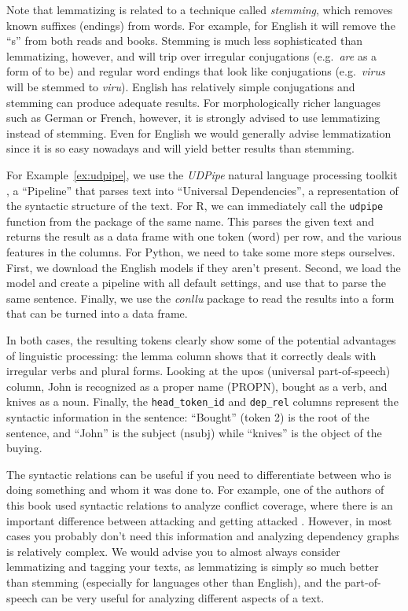 Note that lemmatizing is related to a technique called \emph{stemming}, which removes known suffixes (endings) from words.
For example, for English it will remove the ``s'' from both reads and books.
Stemming is much less sophisticated than lemmatizing, however, and will trip over irregular conjugations
(e.g.\ \emph{are} as a form of to be) and regular word endings that look like conjugations (e.g.\ \emph{virus} will be stemmed to \emph{viru}).
English has relatively simple conjugations and stemming can produce adequate results.
For morphologically richer languages such as German or French, however, it is strongly advised to use lemmatizing instead of stemming.
Even for English we would generally advise lemmatization since it is so easy nowadays and will yield better results than stemming.

For Example~\ref{ex:udpipe}, we use the \emph{UDPipe} natural language processing toolkit \citep{udpipe},
a ``Pipeline'' that parses text into ``Universal Dependencies'', a representation of the syntactic structure of the text.
For R, we can immediately call the \texttt{udpipe} function from the package of the same name.
This parses the given text and returns the result as a data frame with one token (word) per row,
and the various features in the columns.
For Python, we need to take some more steps ourselves.
First, we download the English models if they aren't present.
Second, we load the model and create a pipeline with all default settings,
and use that to parse the same sentence.
Finally, we use the \emph{conllu} package to read the results into a form that can be turned into a data frame.

In both cases, the resulting tokens clearly show some of the potential advantages of linguistic processing:
the lemma column shows that it correctly deals with irregular verbs and plural forms.
Looking at the upos (universal part-of-speech) column, John is recognized as a proper name (PROPN), bought as a verb, and knives as a noun.
Finally, the \verb|head_token_id| and \verb|dep_rel| columns represent the syntactic information in the sentence:
``Bought'' (token 2) is the root of the sentence, and ``John'' is the subject (nsubj) while ``knives'' is the object of the buying.


The syntactic relations can be useful if you need to differentiate between who is doing something and whom it was done to.
For example, one of the authors of this book used syntactic relations to analyze conflict coverage,
where there is an important difference between attacking and getting attacked \citep{clause}.
However, in most cases you probably don't need this information and analyzing dependency graphs is relatively complex.
We would advise you to almost always consider lemmatizing and tagging your texts, as lemmatizing is simply so much better than stemming
(especially for languages other than English), and the part-of-speech can be very useful for analyzing different aspects of a text.


